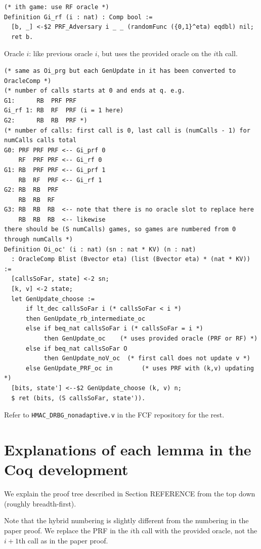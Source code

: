 \documentclass[12pt,lot, lof]{puthesis}
\newcommand{\li} {\lstinline}
\begin{document}
{\begin{lstlisting}
(* ith game: use RF oracle *)
Definition Gi_rf (i : nat) : Comp bool :=
  [b, _] <-$2 PRF_Adversary i _ _ (randomFunc ({0,1}^eta) eqdbl) nil;
  ret b.
\end{lstlisting}

Oracle $i$: like previous oracle $i$, but uses the provided oracle on the $i$th call.

\begin{lstlisting}
(* same as Oi_prg but each GenUpdate in it has been converted to OracleComp *)
(* number of calls starts at 0 and ends at q. e.g.
G1:      RB  PRF PRF
Gi_rf 1: RB  RF  PRF (i = 1 here)
G2:      RB  RB  PRF *)
(* number of calls: first call is 0, last call is (numCalls - 1) for numCalls calls total
G0: PRF PRF PRF <-- Gi_prf 0
    RF  PRF PRF <-- Gi_rf 0
G1: RB  PRF PRF <-- Gi_prf 1
    RB  RF  PRF <-- Gi_rf 1
G2: RB  RB  PRF
    RB  RB  RF
G3: RB  RB  RB  <-- note that there is no oracle slot to replace here
    RB  RB  RB  <-- likewise
there should be (S numCalls) games, so games are numbered from 0 through numCalls *)
Definition Oi_oc' (i : nat) (sn : nat * KV) (n : nat) 
  : OracleComp Blist (Bvector eta) (list (Bvector eta) * (nat * KV)) :=
  [callsSoFar, state] <-2 sn;
  [k, v] <-2 state;
  let GenUpdate_choose := 
      if lt_dec callsSoFar i (* callsSoFar < i *)
      then GenUpdate_rb_intermediate_oc
      else if beq_nat callsSoFar i (* callsSoFar = i *)
           then GenUpdate_oc    (* uses provided oracle (PRF or RF) *)
      else if beq_nat callsSoFar O 
           then GenUpdate_noV_oc  (* first call does not update v *)
      else GenUpdate_PRF_oc in        (* uses PRF with (k,v) updating *)
  [bits, state'] <--$2 GenUpdate_choose (k, v) n;
  $ ret (bits, (S callsSoFar, state')).
  \end{lstlisting}

Refer to \li|HMAC_DRBG_nonadaptive.v| in the FCF repository for the rest.


\chapter{Explanations of each lemma in the Coq development} \label{sec:explanations_of_each_lemma_in_the_coq_development}

We explain the proof tree described in Section REFERENCE from the top down (roughly breadth-first).

Note that the hybrid numbering is slightly different from the numbering in the paper proof. We replace the PRF in the $i$th call with the provided oracle, not the $i+1$th call as in the paper proof.

}
\end{document}
